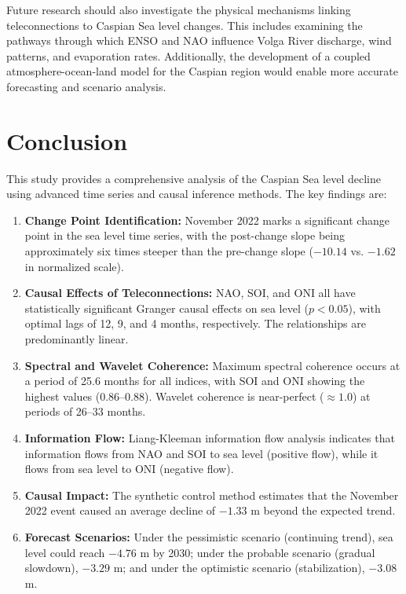 \documentclass[12pt,a4paper,twocolumn]{article}
\begin{document}
Future research should also investigate the physical mechanisms linking teleconnections to Caspian Sea level changes. This includes examining the pathways through which ENSO and NAO influence Volga River discharge, wind patterns, and evaporation rates. Additionally, the development of a coupled atmosphere-ocean-land model for the Caspian region would enable more accurate forecasting and scenario analysis.

\section{Conclusion}

This study provides a comprehensive analysis of the Caspian Sea level decline using advanced time series and causal inference methods. The key findings are:

\begin{enumerate}
    \item \textbf{Change Point Identification:} November 2022 marks a significant change point in the sea level time series, with the post-change slope being approximately six times steeper than the pre-change slope ($-10.14$ vs. $-1.62$ in normalized scale).
    
    \item \textbf{Causal Effects of Teleconnections:} NAO, SOI, and ONI all have statistically significant Granger causal effects on sea level ($p < 0.05$), with optimal lags of 12, 9, and 4 months, respectively. The relationships are predominantly linear.
    
    \item \textbf{Spectral and Wavelet Coherence:} Maximum spectral coherence occurs at a period of 25.6 months for all indices, with SOI and ONI showing the highest values (0.86–0.88). Wavelet coherence is near-perfect ($\approx 1.0$) at periods of 26–33 months.
    
    \item \textbf{Information Flow:} Liang-Kleeman information flow analysis indicates that information flows from NAO and SOI to sea level (positive flow), while it flows from sea level to ONI (negative flow).
    
    \item \textbf{Causal Impact:} The synthetic control method estimates that the November 2022 event caused an average decline of $-1.33$ m beyond the expected trend.
    
    \item \textbf{Forecast Scenarios:} Under the pessimistic scenario (continuing trend), sea level could reach $-4.76$ m by 2030; under the probable scenario (gradual slowdown), $-3.29$ m; and under the optimistic scenario (stabilization), $-3.08$ m.
\end{enumerate}
\end{document}
